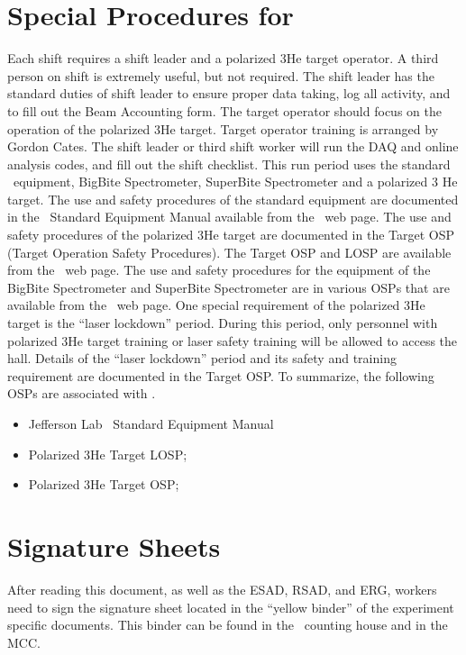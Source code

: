 %
%
\section{Special Procedures for \EXPTS}
Each shift requires a shift leader and a polarized 3He target operator. A third
person on shift is extremely useful, but not required. The shift leader has the
standard duties of shift leader to ensure proper data taking, log all activity, and
to fill out the Beam Accounting form. The target operator should focus on the
operation of the polarized 3He target. Target operator training is arranged by
Gordon Cates. The shift leader or third shift worker will run the DAQ and
online analysis codes, and fill out the shift checklist.
This run period uses the standard \HALL\ equipment, BigBite Spectrometer, SuperBite Spectrometer
 and a polarized 3 He target. The use and safety procedures of the standard
equipment are documented in the \HALL\ Standard Equipment Manual available 
from the \HALL\ web page. The use and safety procedures of the polarized
3He target are documented in the Target OSP (Target Operation Safety Procedures).  
The Target OSP and LOSP are  available from the \HALL\ web page.  The use and safety procedures
for the equipment of the BigBite Spectrometer and SuperBite Spectrometer are in various OSPs
 that are  available from the \HALL\ web page.
One special requirement of the polarized 3He target is the ``laser lockdown''
period. During this period, only personnel with polarized 3He target training
or laser safety training will be allowed to access the hall. Details of the ``laser
lockdown'' period and its safety and training requirement are documented in
the Target OSP.
To summarize, the following OSPs are associated with \EXPTS.

\begin{itemize}
\item Jefferson Lab \HALL\ Standard Equipment Manual
\item Polarized 3He Target LOSP;
\item Polarized 3He Target OSP;
\end{itemize}

\newpage
\section{Signature Sheets}

After reading this document, as well as the ESAD, RSAD, and ERG, workers need to sign
the signature sheet located in the ``yellow binder'' of the experiment specific documents.
This binder can be found in the \HALL\ counting house and in the MCC.

